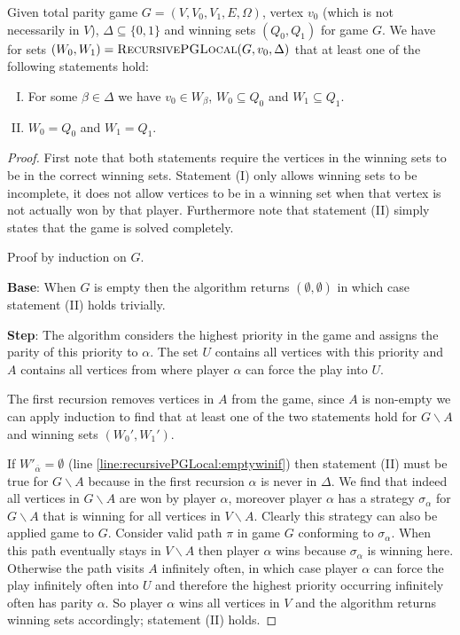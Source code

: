 \begin{theorem}
	Given total parity game $G = (V,V_0,V_1,E,\Omega)$, vertex $v_0$ (which is not necessarily in $V$), $\Delta \subseteq \{0,1\}$ and winning sets $(Q_0,Q_1)$ for game $G$. We have for sets $(W_0,W_1) = \textsc{RecursivePGLocal}(G,v_0,\Delta)$ that at least one of the following statements hold:
	\begin{enumerate}[(I)]
		\item For some $\beta \in \Delta$ we have $v_0 \in W_\beta$, $W_0 \subseteq Q_0$ and $W_1 \subseteq Q_1$.
		\item $W_0 = Q_0$ and $W_1 = Q_1$.
	\end{enumerate}
		\begin{proof}
			First note that both statements require the vertices in the winning sets to be in the correct winning sets. Statement (I) only allows winning sets to be incomplete, it does not allow vertices to be in a winning set when that vertex is not actually won by that player. Furthermore note that statement (II) simply states that the game is solved completely.
			
			Proof by induction on $G$. 
			
			\textbf{Base}: When $G$ is empty then the algorithm returns $(\emptyset, \emptyset)$ in which case statement (II) holds trivially.
			
			\textbf{Step}: The algorithm considers the highest priority in the game and assigns the parity of this priority to $\alpha$. The set $U$ contains all vertices with this priority and $A$ contains all vertices from where player $\alpha$ can force the play into $U$.
			
			The first recursion removes vertices in $A$ from the game, since $A$ is non-empty we can apply induction to find that at least one of the two statements hold for $G\backslash A$ and winning sets $(W_0',W_1')$.
			
			If $W'_{\overline{\alpha}} = \emptyset$ (line \ref{line:recursivePGLocal:emptywinif}) then statement (II) must be true for $G \backslash A$ because in the first recursion $\alpha$ is never in $\Delta$. We find that indeed all vertices in $G\backslash A$ are won by player $\alpha$, moreover player $\alpha$ has a strategy $\sigma_\alpha$ for $G\backslash A$ that is winning for all vertices in $V\backslash A$. Clearly this strategy can also be applied game to $G$. Consider valid path $\pi$ in game $G$ conforming to $\sigma_\alpha$. When this path eventually stays in $V \backslash A$ then player $\alpha$ wins because $\sigma_\alpha$ is winning here. Otherwise the path visits $A$ infinitely often, in which case player $\alpha$ can force the play infinitely often into $U$ and therefore the highest priority occurring infinitely often has parity $\alpha$. So player $\alpha$ wins all vertices in $V$ and the algorithm returns winning sets accordingly; statement (II) holds.
			

\end{proof}
\end{theorem}
